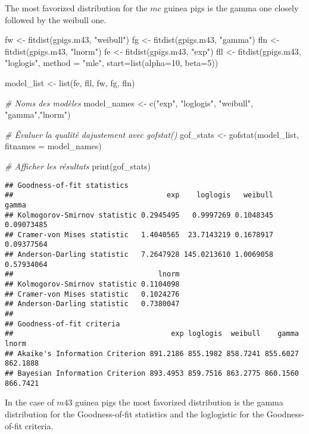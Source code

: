 \documentclass[
]{article}
\newenvironment{Shaded}{\begin{snugshade}}{\end{snugshade}}
\newcommand{\AttributeTok}[1]{\textcolor[rgb]{0.77,0.63,0.00}{#1}}
\newcommand{\CommentTok}[1]{\textcolor[rgb]{0.56,0.35,0.01}{\textit{#1}}}
\newcommand{\DecValTok}[1]{\textcolor[rgb]{0.00,0.00,0.81}{#1}}
\newcommand{\FunctionTok}[1]{\textcolor[rgb]{0.00,0.00,0.00}{#1}}
\newcommand{\NormalTok}[1]{#1}
\newcommand{\OtherTok}[1]{\textcolor[rgb]{0.56,0.35,0.01}{#1}}
\newcommand{\StringTok}[1]{\textcolor[rgb]{0.31,0.60,0.02}{#1}}
\begin{document}
The most favorized distribution for the \(mc\) guinea pigs is the gamma
one closely followed by the weibull one.

\begin{Shaded}
\begin{Highlighting}[]
\NormalTok{fw }\OtherTok{\textless{}{-}} \FunctionTok{fitdist}\NormalTok{(gpigs.m43, }\StringTok{"weibull"}\NormalTok{)}
\NormalTok{fg }\OtherTok{\textless{}{-}} \FunctionTok{fitdist}\NormalTok{(gpigs.m43, }\StringTok{"gamma"}\NormalTok{) }
\NormalTok{fln }\OtherTok{\textless{}{-}} \FunctionTok{fitdist}\NormalTok{(gpigs.m43, }\StringTok{"lnorm"}\NormalTok{) }
\NormalTok{fe }\OtherTok{\textless{}{-}} \FunctionTok{fitdist}\NormalTok{(gpigs.m43, }\StringTok{"exp"}\NormalTok{) }
\NormalTok{fll }\OtherTok{\textless{}{-}} \FunctionTok{fitdist}\NormalTok{(gpigs.m43, }\StringTok{"loglogis"}\NormalTok{, }\AttributeTok{method =} \StringTok{"mle"}\NormalTok{, }\AttributeTok{start=}\FunctionTok{list}\NormalTok{(}\AttributeTok{alpha=}\DecValTok{10}\NormalTok{, }\AttributeTok{beta=}\DecValTok{5}\NormalTok{))}

\NormalTok{model\_list }\OtherTok{\textless{}{-}} \FunctionTok{list}\NormalTok{(fe, fll, fw, fg, fln)}

\CommentTok{\# Noms des modèles}
\NormalTok{model\_names }\OtherTok{\textless{}{-}} \FunctionTok{c}\NormalTok{(}\StringTok{"exp"}\NormalTok{, }\StringTok{"loglogis"}\NormalTok{, }\StringTok{"weibull"}\NormalTok{, }\StringTok{"gamma"}\NormalTok{,}\StringTok{"lnorm"}\NormalTok{)}

\CommentTok{\# Évaluer la qualité d\textquotesingle{}ajustement avec gofstat()}
\NormalTok{gof\_stats }\OtherTok{\textless{}{-}} \FunctionTok{gofstat}\NormalTok{(model\_list, }\AttributeTok{fitnames =}\NormalTok{ model\_names)}

\CommentTok{\# Afficher les résultats}
\FunctionTok{print}\NormalTok{(gof\_stats)}
\end{Highlighting}
\end{Shaded}

\begin{verbatim}
## Goodness-of-fit statistics
##                                    exp    loglogis   weibull      gamma
## Kolmogorov-Smirnov statistic 0.2945495   0.9997269 0.1048345 0.09073485
## Cramer-von Mises statistic   1.4040565  23.7143219 0.1678917 0.09377564
## Anderson-Darling statistic   7.2647928 145.0213610 1.0069058 0.57934064
##                                  lnorm
## Kolmogorov-Smirnov statistic 0.1104098
## Cramer-von Mises statistic   0.1024276
## Anderson-Darling statistic   0.7380047
## 
## Goodness-of-fit criteria
##                                     exp loglogis  weibull    gamma    lnorm
## Akaike's Information Criterion 891.2186 855.1982 858.7241 855.6027 862.1888
## Bayesian Information Criterion 893.4953 859.7516 863.2775 860.1560 866.7421
\end{verbatim}

In the case of \(m43\) guinea pigs the most favorized distribution is
the gamma distribution for the Goodness-of-fit statistics and the
loglogistic for the Goodness-of-fit criteria.
\end{document}
